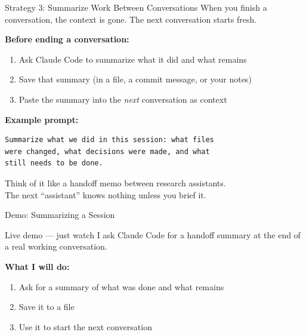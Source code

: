 \documentclass[aspectratio=169, 11pt]{beamer}
\begin{document}
\begin{frame}[fragile]{Strategy 3: Summarize Work Between Conversations}
  When you finish a conversation, the context is gone. The next conversation starts fresh.

  \vspace{0.8em}
  \textbf{Before ending a conversation:}
  \begin{enumerate}
    \item Ask Claude Code to summarize what it did and what remains
    \item Save that summary (in a file, a commit message, or your notes)
    \item Paste the summary into the \textit{next} conversation as context
  \end{enumerate}

  \vspace{0.8em}
  \textbf{Example prompt:}
  \begin{lstlisting}
Summarize what we did in this session: what files
were changed, what decisions were made, and what
still needs to be done.
  \end{lstlisting}

  \vspace{0.5em}
  \alert{Think of it like a handoff memo between research assistants.}\\
  The next ``assistant'' knows nothing unless you brief it.
\end{frame}

\begin{frame}{Demo: Summarizing a Session}
  \begin{alertblock}{Live demo --- just watch}
    I ask Claude Code for a handoff summary at the end of a real working conversation.
  \end{alertblock}

  \vspace{0.8em}
  \textbf{What I will do:}
  \begin{enumerate}
    \item Ask for a summary of what was done and what remains
    \item Save it to a file
    \item Use it to start the next conversation
  \end{enumerate}
\end{frame}
\end{document}
